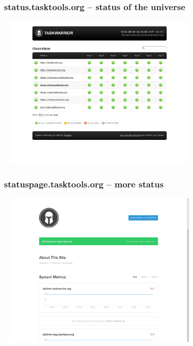 \documentclass[t]{beamer}
\begin{document}
\begin{frame}\frametitle{status.tasktools.org -- status of the universe}
    \begin{center}
        \href{http://status.tasktools.org/}{\includegraphics[width=10cm,height=7.5cm]{status-tasktools-org.png}}
    \end{center}
\end{frame}

\begin{frame}\frametitle{statuspage.tasktools.org -- more status}
    \begin{center}
        \href{http://statuspage.tasktools.org/}{\includegraphics[width=10cm,height=7.5cm]{statuspage-tasktools-org.png}}
    \end{center}
\end{frame}
\end{document}
